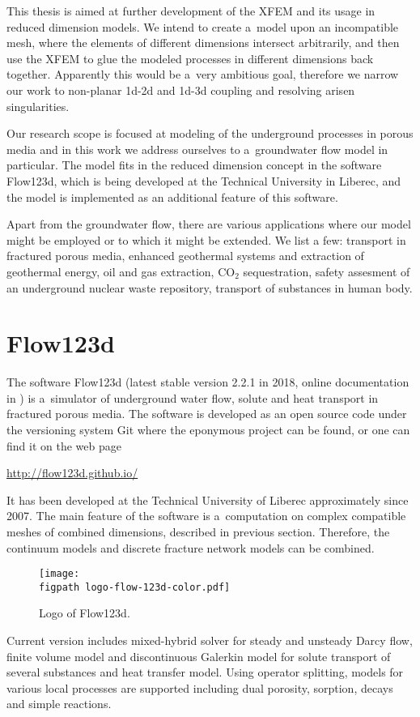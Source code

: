 This thesis is aimed at further development of the XFEM and its usage in reduced dimension models. 
We intend to create a~model upon an incompatible mesh, where the elements of different dimensions intersect
arbitrarily, and then use the XFEM to glue the modeled processes in different dimensions back together. 
Apparently this would be a~very ambitious goal, therefore we narrow our work to non-planar 1d-2d and 1d-3d coupling
and resolving arisen singularities. 

Our research scope is focused at modeling of the underground processes in porous media
and in this work we address ourselves to a~groundwater flow model in particular.
The model fits in the reduced dimension concept in the software Flow123d, which is being developed at the
Technical University in Liberec, and the model is implemented as an additional feature of this software.

Apart from the groundwater flow, there are various applications where our model might be employed or to which it might be extended.
We list a few: transport in fractured porous media, enhanced geothermal systems and extraction of geothermal energy,
oil and gas extraction, CO$_2$ sequestration, safety assesment of an underground nuclear waste repository,
transport of substances in human body.


\section{Flow123d}
\label{sec:soa_flow123d}

The software Flow123d (latest stable version 2.2.1 in 2018, online documentation in \cite{flow123d_doc_2015}) 
is a~simulator of underground water flow, solute and heat transport in fractured porous media. The software is
developed as an open source code under the versioning system Git where the eponymous project can be found, or 
one can find it on the web page
\begin{center}
\url{http://flow123d.github.io/}
\end{center}
It has been developed at the Technical University of Liberec approximately since 2007.
The main feature of the software is a~computation on complex compatible meshes of combined dimensions, described in
previous section. Therefore, the continuum models and discrete fracture network models can be combined.
%
\begin{figure}[!htb]
  \centering
  \texttt{[image: \\figpath logo-flow-123d-color.pdf]}
  \caption{Logo of Flow123d.}
  \label{fig:logo_flow123d}
\end{figure}
%
Current version includes mixed-hybrid solver for steady and unsteady Darcy flow, finite volume model 
and discontinuous Galerkin model for solute transport of several substances and heat transfer model. 
Using operator splitting, models for various local processes are supported including dual porosity, sorption, decays 
and simple reactions.



